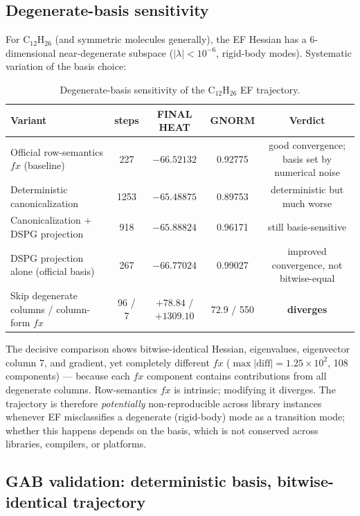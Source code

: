 \documentclass[preprint,12pt]{elsarticle}
\begin{document}
\subsection{Degenerate-basis sensitivity}\label{sec:res-degen}

For C$_{12}$H$_{26}$ (and symmetric molecules generally), the EF Hessian has a 6-dimensional near-degenerate subspace ($|\lambda| < 10^{-6}$, rigid-body modes). Systematic variation of the basis choice:
\begin{table}[h]
\centering
\caption{Degenerate-basis sensitivity of the C$_{12}$H$_{26}$ EF trajectory.}\label{tab:degen}
\begin{tabular}{lcccc}
\toprule
Variant & steps & FINAL HEAT & GNORM & Verdict \\
\midrule
Official row-semantics $fx$ (baseline) & 227 & $-66.52132$ & 0.92775 & good convergence; basis set by numerical noise \\
Deterministic canonicalization & 1253 & $-65.48875$ & 0.89753 & deterministic but much worse \\
Canonicalization + DSPG projection & 918 & $-65.88824$ & 0.96171 & still basis-sensitive \\
DSPG projection alone (official basis) & 267 & $-66.77024$ & 0.99027 & improved convergence, not bitwise-equal \\
Skip degenerate columns / column-form $fx$ & 96 / 7 & $+78.84$ / $+1309.10$ & 72.9 / 550 & \textbf{diverges} \\
\bottomrule
\end{tabular}
\end{table}

The decisive comparison shows bitwise-identical Hessian, eigenvalues, eigenvector column 7, and gradient, yet completely different $fx$ ($\max|\mathrm{diff}| = 1.25\times10^2$, 108 components) --- because each $fx$ component contains contributions from all degenerate columns. Row-semantics $fx$ is intrinsic; modifying it diverges. The trajectory is therefore \emph{potentially} non-reproducible across library instances whenever EF misclassifies a degenerate (rigid-body) mode as a transition mode; whether this happens depends on the basis, which is not conserved across libraries, compilers, or platforms.

\subsection{GAB validation: deterministic basis, bitwise-identical trajectory}\label{sec:res-gab}
\end{document}
